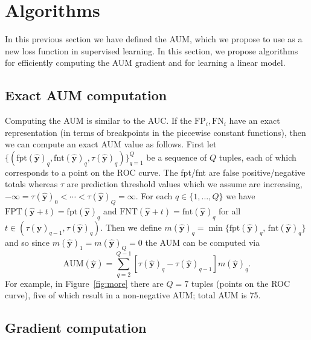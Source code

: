 \documentclass{article}
\begin{document}
\section{Algorithms}
\label{sec:algorithms}

In this previous section we have defined the AUM, which we propose to use as a new loss function in supervised learning.
In this section, we propose algorithms for efficiently computing the AUM gradient and for learning a linear model.

\subsection{Exact AUM computation}

Computing the AUM is similar to the AUC. 
If the $\text{FP}_i,\text{FN}_i$ have an exact representation (in terms of breakpoints in the piecewise constant functions), then we can compute an exact AUM value as follows.
First let $\{(
\text{fpt}
(\mathbf {\hat y})
_q, \text{fnt}
(\mathbf {\hat y})
_q,
 \tau
(\mathbf {\hat y})
_q
)\}_{q=1}^Q$ 
be a sequence of $Q$ tuples, each of which corresponds to a point on the ROC curve.
The fpt/fnt are false positive/negative totals whereas $\tau$ are prediction threshold values 
which we assume are increasing, $ -\infty = \tau
(\mathbf {\hat y})
_0 < \cdots <  \tau
(\mathbf {\hat y})
_Q = \infty$.
For each $q\in\{1,\dots,Q\}$ we have 
$\text{FPT}(\mathbf{\hat y}+t)=\text{fpt}(\mathbf {\hat y})_q$
and
$\text{FNT}(\mathbf{\hat y}+t)=\text{fnt}(\mathbf {\hat y})_q$
for all $t\in(\tau(\mathbf {\hat y})_{q-1}, \tau(\mathbf {\hat y})_q)$.
Then we define $m(\mathbf {\hat y})_q = \min\{
    \text{fpt}(\mathbf {\hat y})_q , \, 
    \text{fnt}(\mathbf {\hat y})_q
\}$ and so since 
$m(\mathbf {\hat y})_1=m(\mathbf {\hat y})_Q=0$ the AUM can be computed via
\begin{equation}
\label{eq:AUM-computation}
    \text{AUM}(\mathbf {\hat y}) =
    \sum_{q=2}^{Q-1}
    [ \tau(\mathbf {\hat y})_{q} - \tau(\mathbf {\hat y})_{q-1} ]
    m(\mathbf {\hat y})_q.
\end{equation}
For example, in Figure~\ref{fig:more} there are $Q=7$ tuples (points on the ROC curve), five of which result in a non-negative AUM; total AUM is 75.

\subsection{Gradient computation}
\label{sec:gradient-computation}
\end{document}
